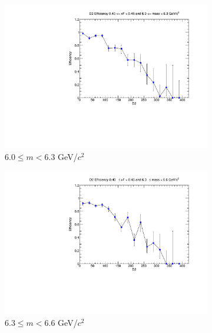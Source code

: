 \begin{figure}[p]
\begin{subfigure}[b]{0.32\textwidth}
        \includegraphics[width=\textwidth]{./kTrackerEfficiencyPlots/D2_Efficiency_xF8_mass6.pdf}
        \caption{$6.0 \leq m < 6.3$ GeV/$c^2$}
        \label{fig:xF8_mass6}
    \end{subfigure}
    \hfill
    \begin{subfigure}[b]{0.32\textwidth}
        \centering
        \includegraphics[width=\textwidth]{./kTrackerEfficiencyPlots/D2_Efficiency_xF8_mass7.pdf}
        \caption{$6.3 \leq m < 6.6$ GeV/$c^2$}
        \label{fig:xF8_mass7}
    \end{subfigure}
    \hfill
    \begin{subfigure}[b]{0.32\textwidth}
        \centering

\end{subfigure}
\end{figure}

